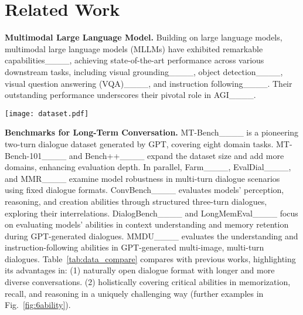 \section{Related Work}
\vspace{-0.1cm}
\textbf{Multimodal Large Language Model.}
Building on large language models, multimodal large language models (MLLMs) have exhibited remarkable capabilities____, achieving state-of-the-art performance across various downstream tasks, including visual grounding____, object detection____, visual question answering (VQA)____, and instruction following____. Their outstanding performance underscores their pivotal role in AGI____.

\begin{figure*}[!t]
 \centering
  \captionsetup{justification=raggedright, singlelinecheck=false}
  \texttt{[image: dataset.pdf]} 
  \vspace{-0.2cm}
  \caption{A sample from the \ours{}, featuring a multi-turn open-ended conversation with six human-annotated questions and answers, designed to assess the ability of MLLMs in open-ended conversations.}
  \vspace{-0.4cm}
  \label{fig:6ability}
\end{figure*}

\noindent \textbf{Benchmarks for Long-Term Conversation.}
MT-Bench____ is a pioneering two-turn dialogue dataset generated by GPT, covering eight domain tasks. MT-Bench-101____ and Bench++____ expand the dataset size and add more domains, enhancing evaluation depth. In parallel, Farm____, EvalDial____, and MMR____ examine model robustness in multi-turn dialogue scenarios using fixed dialogue formats. ConvBench____ evaluates models' perception, reasoning, and creation abilities through structured three-turn dialogues, exploring their interrelations. DialogBench____ and LongMemEval____ focus on evaluating models' abilities in context understanding and memory retention during GPT-generated dialogues. MMDU____ evaluates the understanding and instruction-following abilities in GPT-generated multi-image, multi-turn dialogues. Table~\ref{tab:data_compare} compares \ours{} with previous works, highlighting its advantages in: (1) naturally open dialogue format with longer and more diverse conversations. (2) holistically covering critical abilities in memorization, recall, and reasoning in a uniquely challenging way (further examples in Fig.~\ref{fig:6ability}).

\vspace{-0.2cm}